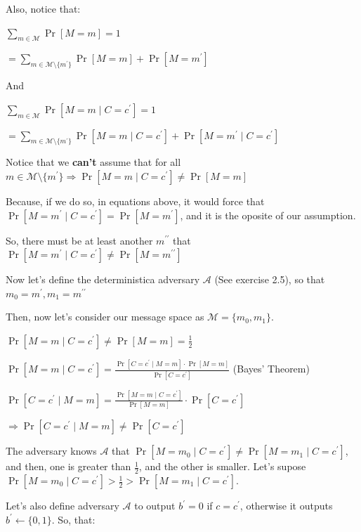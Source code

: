 Also, notice that:

$\sum_{m \in \mathcal{M}} \Pr[M = m] = 1$

$ = \sum_{m \in \mathcal{M} \setminus \{m^\prime\}} \Pr[M = m] + \Pr[M = m^\prime]$ 

And

$\sum_{m \in \mathcal{M}} \Pr[M = m \mid C = c^\prime] = 1$


$= \sum_{m \in \mathcal{M} \setminus \{m^\prime\}} \Pr[M = m \mid C = c^\prime] + \Pr[M = m^\prime \mid C = c^\prime]$

Notice that we \textbf{can't} assume that  for all $m \in \mathcal{M} \setminus \{m^\prime\} \Rightarrow \Pr[M = m \mid C = c^\prime] \ne \Pr[M = m]$

Because, if we do so, in equations above, it would force that $\Pr[M = m^\prime \mid C = c^\prime] = \Pr[M = m^\prime]$, and it is the oposite of our assumption.

So, there must be at least another $m^{\prime\prime}$ that $\Pr[M = m^\prime \mid C = c^\prime] \ne \Pr[M = m^{\prime\prime}]$

\vspace{1em}

Now let's define the deterministica adversary $\mathcal{A}$ (See exercise 2.5), so that $m_0 = m^\prime, m_1 = m^{\prime\prime}$

Then, now let's consider our message space as $\mathcal{M} = \{m_0, m_1\}$.

$\Pr[M = m \mid C = c^\prime] \ne \Pr[M = m] = \frac{1}{2}$

\vspace{1em}

$\Pr[M = m \mid C = c^\prime] = \frac{\Pr[C = c^\prime \mid M = m]\cdot\Pr[M = m]}{\Pr[C = c^\prime]}$  (Bayes' Theorem)

$\Pr[C = c^\prime \mid M = m] = \frac{\Pr[M = m \mid C = c^\prime]}{\Pr[M = m]}\cdot\Pr[C = c^\prime]$

$\Rightarrow \Pr[C = c^\prime \mid M = m] \ne \Pr[C = c^\prime]$

\vspace{1em}

The adversary knows $\mathcal{A}$ that $\Pr[M = m_0 \mid C = c^\prime] \ne \Pr[M = m_1 \mid C = c^\prime]$, and then, one is greater than $\frac{1}{2}$, and the other is smaller. Let's supose $\Pr[M = m_0 \mid C = c^\prime] > \frac{1}{2}  > \Pr[M = m_1 \mid C = c^\prime]$.

Let's also define adversary $\mathcal{A}$ to output $b^\prime = 0$ if $c = c^\prime$, otherwise it outputs $b^\prime \leftarrow \{0, 1\}$. So, that:

